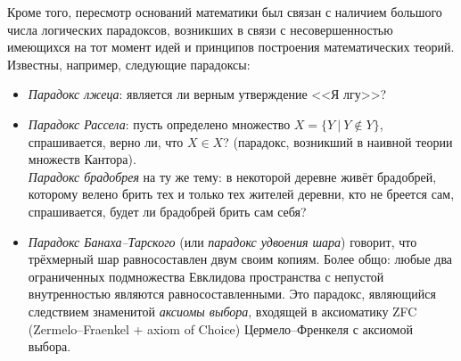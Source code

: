Кроме того, пересмотр оснований математики был связан с наличием большого числа логических парадоксов, возникших в связи с несовершенностью имеющихся на тот момент идей и принципов построения математических теорий. Известны, например, следующие парадоксы:
\begin{itemize}
    \item \textit{Парадокс лжеца}: является ли верным утверждение <<Я лгу>>?
    \item \textit{Парадокс Рассела}: пусть определено множество $X = \{Y\ |\ Y \not\in Y\}$, спрашивается, верно ли, что $X \in X$? (парадокс, возникший в наивной теории множеств Кантора). \\
    \textit{Парадокс брадобрея} на ту же тему: в некоторой деревне живёт брадобрей, которому велено брить тех и только тех жителей деревни, кто не бреется сам, спрашивается, будет ли брадобрей брить сам себя?
    \item \textit{Парадокс Банаха--Тарского} (или \textit{парадокс удвоения шара}) говорит, что трёхмерный шар равносоставлен двум своим копиям. Более общо: любые два ограниченных подмножества Евклидова пространства с непустой внутренностью являются равносоставленными. Это парадокс, являющийся следствием знаменитой \textit{аксиомы выбора}, входящей в аксиоматику ZFC (Zermelo--Fraenkel + axiom of Choice) Цермело--Френкеля с аксиомой выбора.
\end{itemize}